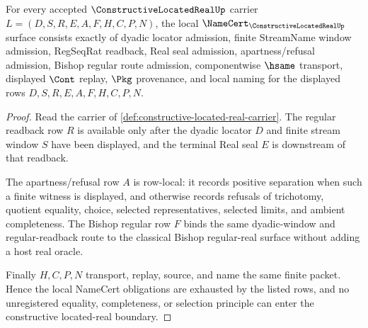 \begin{theorem}
\label{thm:constructive-located-real-regular-namecert}
For every accepted $\ConstructiveLocatedRealUp$ carrier $L=(D,S,R,E,A,F,H,C,P,N)$, the local $\NameCert_{\ConstructiveLocatedRealUp}$ surface consists exactly of dyadic locator admission, finite StreamName window admission, RegSeqRat readback, Real seal admission, apartness/refusal admission, Bishop regular route admission, componentwise $\hsame$ transport, displayed $\Cont$ replay, $\Pkg$ provenance, and local naming for the displayed rows $D,S,R,E,A,F,H,C,P,N$.
\end{theorem}
\begin{proof}
Read the carrier of \autoref{def:constructive-located-real-carrier}. The regular readback row $R$ is available only after the dyadic locator $D$ and finite stream window $S$ have been displayed, and the terminal Real seal $E$ is downstream of that readback.

The apartness/refusal row $A$ is row-local: it records positive separation when such a finite witness is displayed, and otherwise records refusals of trichotomy, quotient equality, choice, selected representatives, selected limits, and ambient completeness. The Bishop regular row $F$ binds the same dyadic-window and regular-readback route to the classical Bishop regular-real surface without adding a host real oracle.

Finally $H,C,P,N$ transport, replay, source, and name the same finite packet. Hence the local NameCert obligations are exhausted by the listed rows, and no unregistered equality, completeness, or selection principle can enter the constructive located-real boundary.
\end{proof}


